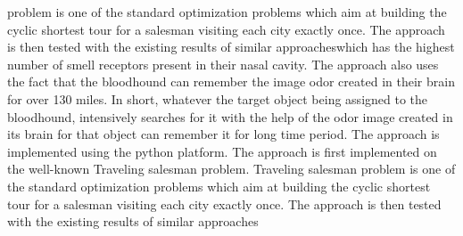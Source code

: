 problem is one of the standard optimization problems which aim at building the cyclic shortest tour for a salesman visiting each city exactly once. The approach is then tested with the existing results of similar approacheswhich has the highest number of smell receptors present in their nasal cavity. The approach also uses the fact that the bloodhound can remember the image odor created in their brain for over 130 miles. In short, whatever the target object being assigned to the bloodhound, intensively searches for it with the help of the odor image created in its brain for that object can remember it for long time period. The approach is implemented using the python platform. The approach is first implemented on the well-known Traveling salesman problem. Traveling salesman problem is one of the standard optimization problems which aim at building the cyclic shortest tour for a salesman visiting each city exactly once. The approach is then tested with the existing results of similar approaches